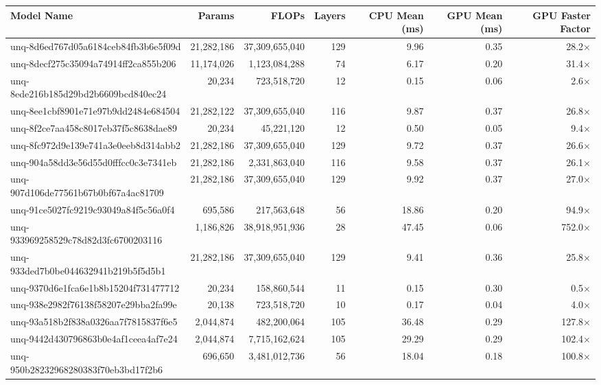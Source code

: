 \begin{table}[h!]
\centering
\fontsize{7}{9}\selectfont
\begin{tabular}{lrrrrrr}
\toprule
\textbf{Model Name} & \textbf{Params} & \textbf{FLOPs} & \textbf{Layers} & \textbf{CPU Mean (ms)} & \textbf{GPU Mean (ms)} & \textbf{GPU Faster Factor} \\
\midrule
unq-8d6ed767d05a6184ceb84fb3b6e5f09d & 21,282,186 & 37,309,655,040 & 129 & 9.96 & 0.35 & 28.2$\times$ \\
unq-8decf275c35094a74914ff2ca855b206 & 11,174,026 & 1,123,084,288 & 74 & 6.17 & 0.20 & 31.4$\times$ \\
unq-8ede216b185d29bd2b6609bcd840ec24 & 20,234 & 723,518,720 & 12 & 0.15 & 0.06 & 2.6$\times$ \\
unq-8ee1cbf8901e71e97b9dd2484e684504 & 21,282,122 & 37,309,655,040 & 116 & 9.87 & 0.37 & 26.8$\times$ \\
unq-8f2ce7aa458c8017eb37f5c8638dae89 & 20,234 & 45,221,120 & 12 & 0.50 & 0.05 & 9.4$\times$ \\
unq-8fc972d9e139e741a3e0eeb8d314abb2 & 21,282,186 & 37,309,655,040 & 129 & 9.72 & 0.37 & 26.6$\times$ \\
unq-904a58dd3e56d55d0fffcc0c3e7341eb & 21,282,186 & 2,331,863,040 & 116 & 9.58 & 0.37 & 26.1$\times$ \\
unq-907d106de77561b67b0bf67a4ac81709 & 21,282,186 & 37,309,655,040 & 129 & 9.92 & 0.37 & 27.0$\times$ \\
unq-91ce5027fc9219c93049a84f5c56a0f4 & 695,586 & 217,563,648 & 56 & 18.86 & 0.20 & 94.9$\times$ \\
unq-933969258529c78d82d3fc6700203116 & 1,186,826 & 38,918,951,936 & 28 & 47.45 & 0.06 & 752.0$\times$ \\
unq-933ded7b0be044632941b219b5f5d5b1 & 21,282,186 & 37,309,655,040 & 129 & 9.41 & 0.36 & 25.8$\times$ \\
unq-9370d6e1fca6e1b8b15204f731477712 & 20,234 & 158,860,544 & 11 & 0.15 & 0.30 & 0.5$\times$ \\
unq-938e2982f76138f58207e29bba2fa99e & 20,138 & 723,518,720 & 10 & 0.17 & 0.04 & 4.0$\times$ \\
unq-93a518b2f838a0326aa7f7815837f6e5 & 2,044,874 & 482,200,064 & 105 & 36.48 & 0.29 & 127.8$\times$ \\
unq-9442d430796863b0e4af1ceea4af7e24 & 2,044,874 & 7,715,162,624 & 105 & 29.29 & 0.29 & 102.4$\times$ \\
unq-950b28232968280383f70eb3bd17f2b6 & 696,650 & 3,481,012,736 & 56 & 18.04 & 0.18 & 100.8$\times$ \\

\end{tabular}
\end{table}
